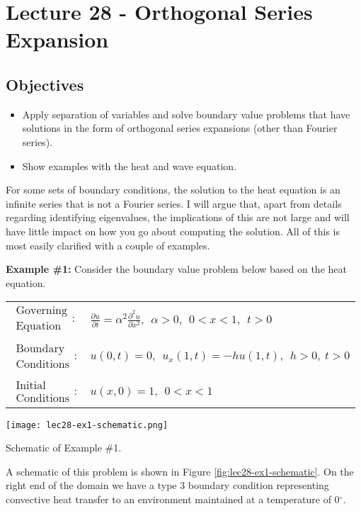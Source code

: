 \chapter{Lecture 28 - Orthogonal Series Expansion}
\label{ch:lec28}
\section{Objectives}
\begin{itemize}
\item Apply separation of variables and solve boundary value problems that have solutions in the form of orthogonal series expansions (other than Fourier series).
\item Show examples with the heat and wave equation.
\end{itemize}
\setcounter{lstannotation}{0} %

For some sets of boundary conditions, the solution to the heat equation is an infinite series that is not a Fourier series.  I will argue that, apart from details regarding identifying eigenvalues, the implications of this are not large and will have little impact on how you go about computing the solution.  All of this is most easily clarified with a couple of examples.

\vspace{0.3cm}

\noindent\textbf{Example \#1:}  Consider the boundary value problem below based on the heat equation.
\begin{table}
\begin{tabular}{l l}
$\substack{\text{Governing} \\\text{Equation}}: $& $\frac{\partial u}{\partial t} = \alpha^2 \frac{\partial^2 u}{\partial x^2},  \ \ \alpha>0, \ \ 0<x<1, \ \ t>0$ \\
& \\
$\substack{\text{Boundary} \\ \text{Conditions}}: $& $u(0,t)=0, \ \ u_x(1,t) = -hu(1,t), \ \ h>0, \  t>0$\\
& \\
$\substack{\text{Initial} \\ \text{Conditions}}: $ & $u(x,0) = 1, \ \ 0<x<1 $ \\
\end{tabular}
\end{table}
\begin{marginfigure}
\texttt{[image: lec28-ex1-schematic.png]}
\caption{Schematic of Example \#1.}
\label{fig:lec28-ex1-schematic}
\end{marginfigure}
A schematic of this problem is shown in Figure \ref{fig:lec28-ex1-schematic}.  On the right end of the domain we have a type 3 boundary condition representing convective heat transfer to an environment maintained at a temperature of 0$^{\circ}$.

